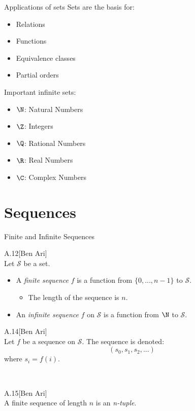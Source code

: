 \begin{slide}[bm=,toc=]{Applications of sets}
Sets are the basis for:
\begin{itemize}
   \item<2-> Relations
   \item<3-> Functions
   \item<4-> Equivalence classes
   \item<5-> Partial orders
\end{itemize}
\pause[5]Important infinite sets: 
\begin{itemize}
   \item<7-> $\N$: Natural Numbers
   \item<8-> $\Z$: Integers
   \item<9-> $\Q$: Rational Numbers
   \item<10-> $\R$: Real Numbers
   \item<11-> $\C$: Complex Numbers
\end{itemize}
\end{slide}

\section[slide=true,tocsection=false]{Sequences}

\begin{slide}[bm=,toc=]{Finite and Infinite Sequences}
\pause
\begin{defn}{A.12}[Ben Ari]~\\\pause
Let $\mathcal{S}$ be a set.
\begin{itemize}
    \item<4-> A \emph{finite sequence} $f$ is a function from $\{0,...,n-1\}$ to $\mathcal{S}$.
    \begin{itemize}
        \item<5-> The length of the sequence is $n$.
    \end{itemize}
    \item<6-> An \emph{infinite sequence} $f$ on $\mathcal{S}$ is a function from $\N$ to $\mathcal{S}$.
    \end{itemize}
\end{defn}
\pause[4]
\begin{defn}{A.14}[Ben Ari]~\\\pause
Let $f$ be a sequence on $\mathcal{S}$. The sequence is denoted:
\pause
\[
  (s_0,s_1,s_2,...)
  \]
\pause
where $s_i = f(i)$.
\end{defn}
~\\
\pause
\begin{defn}{A.15}[Ben Ari]
~\\
\pause
A finite sequence of length $n$ is an \emph{n-tuple}.
\end{defn}

\end{slide}


